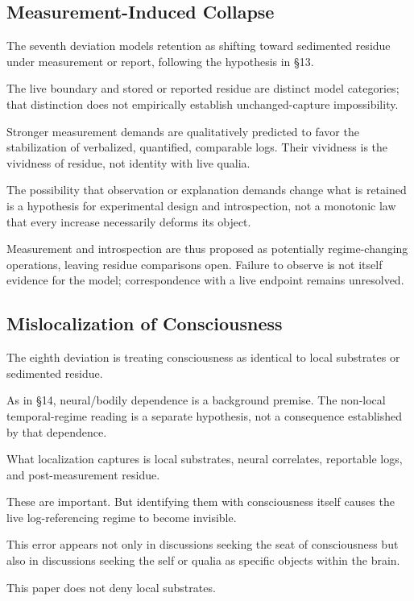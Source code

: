 \subsection{Measurement-Induced Collapse}

The seventh deviation models retention as shifting toward sedimented residue under measurement or report, following the hypothesis in §13.

The live boundary and stored or reported residue are distinct model categories; that distinction does not empirically establish unchanged-capture impossibility.

Stronger measurement demands are qualitatively predicted to favor the stabilization of verbalized, quantified, comparable logs. Their vividness is the vividness of residue, not identity with live qualia.

The possibility that observation or explanation demands change what is retained is a hypothesis for experimental design and introspection, not a monotonic law that every increase necessarily deforms its object.

Measurement and introspection are thus proposed as potentially regime-changing operations, leaving residue comparisons open. Failure to observe is not itself evidence for the model; correspondence with a live endpoint remains unresolved.

\subsection{Mislocalization of Consciousness}


The eighth deviation is treating consciousness as identical to local substrates or sedimented residue.

As in §14, neural/bodily dependence is a background premise. The non-local temporal-regime reading is a separate hypothesis, not a consequence established by that dependence.

What localization captures is local substrates, neural correlates, reportable logs, and post-measurement residue.

These are important. But identifying them with consciousness itself causes the live log-referencing regime to become invisible.

This error appears not only in discussions seeking the seat of consciousness but also in discussions seeking the self or qualia as specific objects within the brain.

This paper does not deny local substrates.

